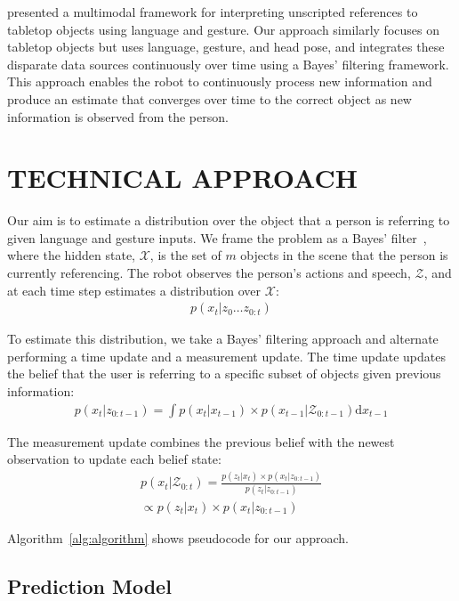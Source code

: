 \documentclass[letterpaper, 10 pt, conference]{ieeeconf}
\begin{document}
\citet{matuszek14} presented a multimodal framework for interpreting
unscripted references to tabletop objects using language and gesture.
Our approach similarly focuses on tabletop objects but uses language,
gesture, and head pose, and integrates these disparate data sources
continuously over time using a Bayes' filtering framework.  This
approach enables the robot to continuously process new information and
produce an estimate that converges over time to the correct object as
new information is observed from the person.  

\section{TECHNICAL APPROACH}

Our aim is to estimate a distribution over the object that a person is
referring to given language and gesture inputs.  We frame the problem
as a Bayes' filter~\citep{thrun08}, where the hidden state,
$\mathcal{X}$, is the set of $m$ objects in the scene that the person
is currently referencing. The robot observes the person's actions and
speech, $\mathcal{Z}$, and at each time step estimates a distribution
over $\mathcal{X}$:
\begin{align}
  p(x_t | z_0 \dots z_{0:t})
\end{align}


To estimate this distribution, we take a Bayes' filtering approach and
alternate performing a time update and a measurement update.  The time
update updates the belief that the user is referring to a specific
subset of objects given previous information:
\begin{align}
p(x_t | z_{0:t-1}) = \int p(x_t|x_{t-1})\times p(x_{t-1} | \mathcal{Z}_{0:t-1}) \text{d}x_{t-1}
\end{align}

The measurement update combines the previous belief with the newest observation to update each belief state: 
\begin{align}
p(x_t | \mathcal{Z}_{0:t}) = \frac{p(z_t | x_t) \times p(x_t | z_{0:t-1})}{p(z_t | z_{0:t-1})} \\\propto p(z_t | x_t) \times p(x_t | z_{0:t-1})
\end{align}

Algorithm~\ref{alg:algorithm} shows pseudocode for our approach.


\subsection{Prediction Model}
\end{document}
